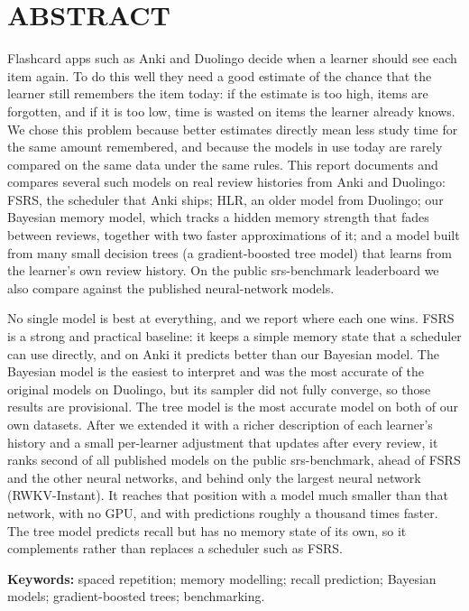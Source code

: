 \chapter*{ABSTRACT}

Flashcard apps such as Anki and Duolingo decide when a learner should see each item again. To do this well they need a good
estimate of the chance that the learner still remembers the item today: if the estimate is too high, items are forgotten,
and if it is too low, time is wasted on items the learner already knows. We chose this problem because better estimates
directly mean less study time for the same amount remembered, and because the models in use today are rarely compared on
the same data under the same rules. This report documents and compares several such models on real review histories from
Anki and Duolingo: FSRS, the scheduler that Anki ships; HLR, an older model from Duolingo; our Bayesian memory model, which
tracks a hidden memory strength that fades between reviews, together with two faster approximations of it; and a model
built from many small decision trees (a gradient-boosted tree model) that learns from the learner's own review history. On
the public srs-benchmark leaderboard we also compare against the published neural-network models.

No single model is best at everything, and we report where each one wins. FSRS is a strong and practical baseline: it
keeps a simple memory state that a scheduler can use directly, and on Anki it predicts better than our Bayesian model. The
Bayesian model is the easiest to interpret and was the most accurate of the original models on Duolingo, but its sampler
did not fully converge, so those results are provisional. The tree model is the most accurate model on both of our own
datasets. After we extended it with a richer description of each learner's history and a small per-learner adjustment
that updates after every review, it ranks second of all published models on the public srs-benchmark, ahead of FSRS and
the other neural networks, and behind only the largest neural network (RWKV-Instant). It reaches that position with a
model much smaller than that network, with no GPU, and with predictions roughly a thousand times faster. The tree model
predicts recall but has no memory state of its own, so it complements rather than replaces a scheduler such as FSRS.

\vspace{1em}
\noindent\textbf{Keywords:} spaced repetition; memory modelling; recall prediction; Bayesian models; gradient-boosted
trees; benchmarking.
